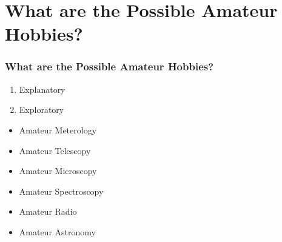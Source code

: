 \documentclass{beamer}
\begin{document}
\section{What are the Possible Amateur Hobbies?}
\begin{frame}
  \frametitle{What are the Possible Amateur Hobbies?}
  \begin{enumerate}
    \item Explanatory
    \item Exploratory
  \end{enumerate}
  \begin{itemize}
    \item Amateur Meterology
    \item Amateur Telescopy
    \item Amateur Microscopy
    \item Amateur Spectroscopy
    \item Amateur Radio
    \item Amateur Astronomy    
  \end{itemize}
\end{frame}
\end{document}
